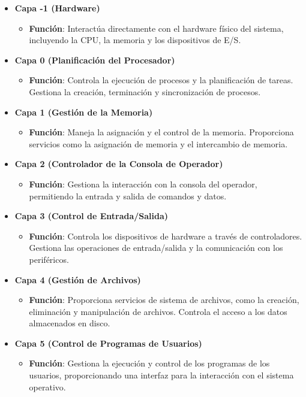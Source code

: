 \begin{tcolorbox}[title=Capas de la estructura jerárquica]


\begin{itemize}
	\item \textbf{Capa -1 (Hardware)}
	\begin{itemize}
		\item \textbf{Función}: Interactúa directamente con el hardware físico del sistema, incluyendo la CPU, la memoria y los dispositivos de E/S.
	\end{itemize}
	
	\item \textbf{Capa 0 (Planificación del Procesador)}
	\begin{itemize}
		\item \textbf{Función}: Controla la ejecución de procesos y la planificación de tareas. Gestiona la creación, terminación y sincronización de procesos.
	\end{itemize}
	
	\item \textbf{Capa 1 (Gestión de la Memoria)}
	\begin{itemize}
		\item \textbf{Función}: Maneja la asignación y el control de la memoria. Proporciona servicios como la asignación de memoria y el intercambio de memoria.
	\end{itemize}
	
	\item \textbf{Capa 2 (Controlador de la Consola de Operador)}
	\begin{itemize}
		\item \textbf{Función}: Gestiona la interacción con la consola del operador, permitiendo la entrada y salida de comandos y datos.
	\end{itemize}
	
	\item \textbf{Capa 3 (Control de Entrada/Salida)}
	\begin{itemize}
		\item \textbf{Función}: Controla los dispositivos de hardware a través de controladores. Gestiona las operaciones de entrada/salida y la comunicación con los periféricos.
	\end{itemize}
	
	\item \textbf{Capa 4 (Gestión de Archivos)}
	\begin{itemize}
		\item \textbf{Función}: Proporciona servicios de sistema de archivos, como la creación, eliminación y manipulación de archivos. Controla el acceso a los datos almacenados en disco.
	\end{itemize}
	
	\item \textbf{Capa 5 (Control de Programas de Usuarios)}
	\begin{itemize}
		\item \textbf{Función}: Gestiona la ejecución y control de los programas de los usuarios, proporcionando una interfaz para la interacción con el sistema operativo.
	\end{itemize}
\end{itemize}
\end{tcolorbox}
